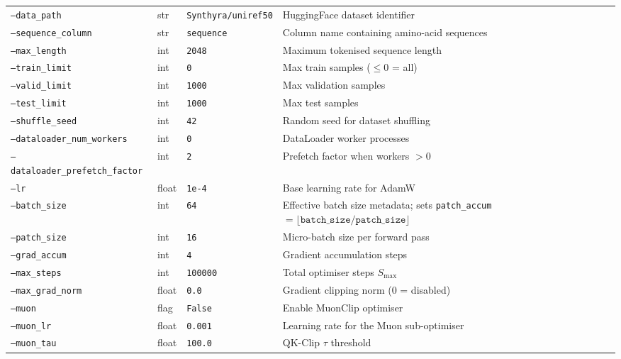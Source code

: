 \documentclass[11pt,a4paper]{article}
\begin{document}
\begin{longtable}{p{5.2cm} p{1.3cm} p{3.2cm} p{5.0cm}}
\texttt{--data\_path} & str & \texttt{Synthyra/uniref50} & HuggingFace dataset identifier \\
\texttt{--sequence\_column} & str & \texttt{sequence} & Column name containing amino-acid sequences \\
\texttt{--max\_length} & int & \texttt{2048} & Maximum tokenised sequence length \\
\texttt{--train\_limit} & int & \texttt{0} & Max train samples ($\le 0$ = all) \\
\texttt{--valid\_limit} & int & \texttt{1000} & Max validation samples \\
\texttt{--test\_limit} & int & \texttt{1000} & Max test samples \\
\texttt{--shuffle\_seed} & int & \texttt{42} & Random seed for dataset shuffling \\
\texttt{--dataloader\_num\_workers} & int & \texttt{0} & DataLoader worker processes \\
\texttt{--dataloader\_prefetch\_factor} & int & \texttt{2} & Prefetch factor when workers $> 0$ \\
\midrule

\texttt{--lr} & float & \texttt{1e-4} & Base learning rate for AdamW \\
\texttt{--batch\_size} & int & \texttt{64} & Effective batch size metadata; sets \texttt{patch\_accum} $= \lfloor\texttt{batch\_size}/\texttt{patch\_size}\rfloor$ \\
\texttt{--patch\_size} & int & \texttt{16} & Micro-batch size per forward pass \\
\texttt{--grad\_accum} & int & \texttt{4} & Gradient accumulation steps \\
\texttt{--max\_steps} & int & \texttt{100000} & Total optimiser steps $S_{\max}$ \\
\texttt{--max\_grad\_norm} & float & \texttt{0.0} & Gradient clipping norm ($0$ = disabled) \\
\texttt{--muon} & flag & \texttt{False} & Enable MuonClip optimiser \\
\texttt{--muon\_lr} & float & \texttt{0.001} & Learning rate for the Muon sub-optimiser \\
\texttt{--muon\_tau} & float & \texttt{100.0} & QK-Clip $\tau$ threshold \\
\midrule


\end{longtable}
\end{document}
